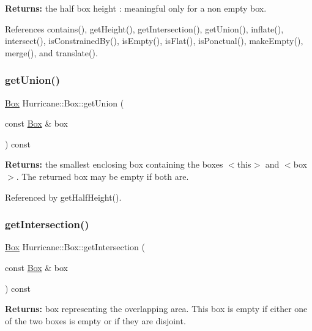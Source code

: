 {\bfseries Returns\+:} the half box height \+: meaningful only for a non empty box. 

References contains(), get\+Height(), get\+Intersection(), get\+Union(), inflate(), intersect(), is\+Constrained\+By(), is\+Empty(), is\+Flat(), is\+Ponctual(), make\+Empty(), merge(), and translate().

\mbox{\label{classHurricane_1_1Box_a2670058f109dfae32d284db249e533bc}} 
\subsubsection{\texorpdfstring{get\+Union()}{getUnion()}}
{\footnotesize\ttfamily \hyperlink{classHurricane_1_1Box}{Box} Hurricane\+::\+Box\+::get\+Union (\begin{DoxyParamCaption}\item[{const \hyperlink{classHurricane_1_1Box}{Box} \&}]{box }\end{DoxyParamCaption}) const}

{\bfseries Returns\+:} the smallest enclosing box containing the boxes {\ttfamily $<$this$>$} and {\ttfamily $<$box$>$}. The returned box may be empty if both are. 

Referenced by get\+Half\+Height().

\mbox{\label{classHurricane_1_1Box_a610f9c63bc5636ef304f4768215ffb12}} 
\subsubsection{\texorpdfstring{get\+Intersection()}{getIntersection()}}
{\footnotesize\ttfamily \hyperlink{classHurricane_1_1Box}{Box} Hurricane\+::\+Box\+::get\+Intersection (\begin{DoxyParamCaption}\item[{const \hyperlink{classHurricane_1_1Box}{Box} \&}]{box }\end{DoxyParamCaption}) const}

{\bfseries Returns\+:} box representing the overlapping area. This box is empty if either one of the two boxes is empty or if they are disjoint. 

